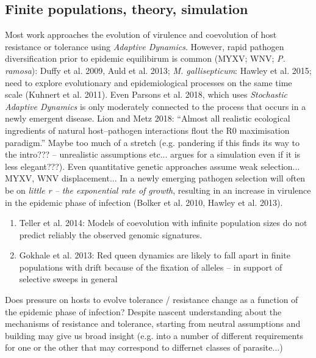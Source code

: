 \documentclass{article}
\begin{document}
\subsection*{Finite populations, theory, simulation}

Most work approaches the evolution of virulence and coevolution of host resistance or tolerance using \emph{Adaptive Dynamics}. However, rapid pathogen diversification prior to epidemic equilibirum is common (MYXV; WNV; \emph{P. ramosa}): Duffy et al. 2009, Auld et al. 2013; \emph{M. gallisepticum}: Hawley et al. 2015; need to explore evolutionary and epidemiological processes on the same time scale (Kuhnert et al. 2011). Even Parsons et al. 2018, which uses \emph{Stochastic Adaptive Dynamics} is only moderately connected to the process that occurs in a newly emergent disease. Lion and Metz 2018: ``Almost all realistic ecological ingredients of natural host–pathogen interactions flout the R0 maximisation paradigm.'' Maybe too much of a stretch (e.g. pandering if this finds its way to the intro??? -- unrealistic assumptions etc... argues for a simulation even if it is less elegant???). Even quantitative genetic approaches assume weak selection... MYXV, WNV displacement... In a newly emerging pathogen selection will often be on \emph{little r -- the exponential rate of growth}, resulting in an increase in virulence in the epidemic phase of infection (Bolker et al. 2010, Hawley et al. 2013).

\begin{enumerate}
    \item Teller et al. 2014: Models of coevolution with infinite population sizes do not predict reliably the observed genomic signatures.
    \item Gokhale et al. 2013: Red queen dynamics are likely to fall apart in finite populations with drift because of the fixation of alleles -- in support of selective sweeps in general
\end{enumerate}

Does pressure on hosts to evolve tolerance / resistance change as a function of the epidemic phase of infection? Despite nascent understanding about the mechanisms of resistance and tolerance, starting from neutral assumptions and building may give us broad insight (e.g. into a number of different requirements for one or the other that may correspond to differnet classes of parasite...)
\end{document}
